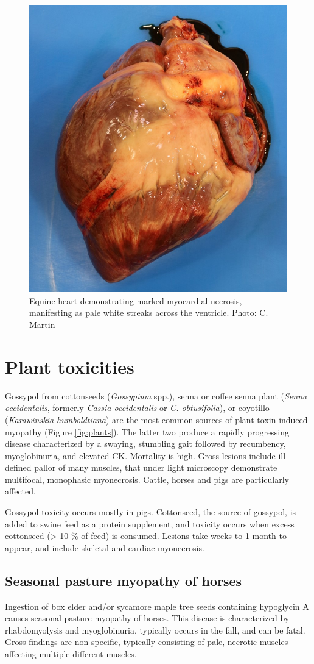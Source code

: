 \documentclass[openany]{report}
\begin{document}
\begin{figure}

{\centering \includegraphics[width=0.3\linewidth]{images/heart-necrosis-2} 

}

\caption{Equine heart demonstrating marked myocardial necrosis, manifesting as pale white streaks across the ventricle. Photo: C. Martin}\label{fig:heart-necrosis2}
\end{figure}

\section{Plant toxicities}\label{plant-toxicities}

Gossypol from cottonseeds (\emph{Gossypium} spp.), senna or coffee senna
plant (\emph{Senna occidentalis}, formerly \emph{Cassia occidentalis} or
\emph{C. obtusifolia}), or coyotillo (\emph{Karawinskia humboldtiana})
are the most common sources of plant toxin-induced myopathy (Figure
\ref{fig:plants}). The latter two produce a rapidly progressing disease
characterized by a swaying, stumbling gait followed by recumbency,
myoglobinuria, and elevated CK. Mortality is high. Gross lesions include
ill-defined pallor of many muscles, that under light microscopy
demonstrate multifocal, monophasic myonecrosis. Cattle, horses and pigs
are particularly affected.

Gossypol toxicity occurs mostly in pigs. Cottonseed, the source of
gossypol, is added to swine feed as a protein supplement, and toxicity
occurs when excess cottonseed (\textgreater{} 10 \% of feed) is
consumed. Lesions take weeks to 1 month to appear, and include skeletal
and cardiac myonecrosis.

\subsection{Seasonal pasture myopathy of
horses}\label{seasonal-pasture-myopathy-of-horses}

Ingestion of box elder and/or sycamore maple tree seeds containing
hypoglycin A causes seasonal pasture myopathy of horses. This disease is
characterized by rhabdomyolysis and myoglobinuria, typically occurs in
the fall, and can be fatal. Gross findings are non-specific, typically
consisting of pale, necrotic muscles affecting multiple different
muscles.
\end{document}
